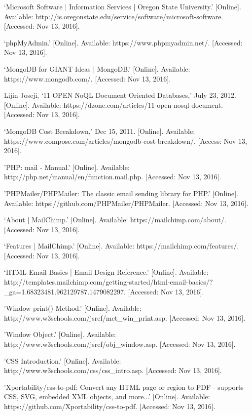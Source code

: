 \documentclass[letterpaper,10pt,serif, draftclsnofoot,onecolumn, compsoc, titlepage]{IEEEtran}
\begin{document}
\begin{thebibliography}{2}
`Microsoft Software | Information Services | Oregon State University.' [Online]. Available: http://is.oregonstate.edu/service/software/microsoft-software. [Accessed: Nov 13, 2016].

`phpMyAdmin.' [Online]. Available: https://www.phpmyadmin.net/. [Accessed: Nov 13, 2016].

`MongoDB for GIANT Ideas | MongoDB.' [Online]. Available: https://www.mongodb.com/. [Accessed: Nov 13, 2016].

Lijin Joseji, `11 OPEN NoQL Document Oriented Databases,' July 23, 2012. [Online]. Available: https://dzone.com/articles/11-open-nosql-document. [Accessed: Nov 13, 2016].

`MongoDB Cost Breakdown,' Dec 15, 2011. [Online]. Available: https://www.compose.com/articles/mongodb-cost-breakdown/. [Access: Nov 13, 2016].

'PHP: mail - Manual.' [Online]. Available: http://php.net/manual/en/function.mail.php. [Accessed: Nov 13, 2016].

'PHPMailer/PHPMailer: The classic email sending library for PHP.' [Online]. Available: https://github.com/PHPMailer/PHPMailer. [Accessed: Nov 13, 2016].

`About | MailChimp.' [Online]. Available: https://mailchimp.com/about/. [Accessed: Nov 13, 2016]. 

`Features | MailChimp.' [Online]. Available: https://mailchimp.com/features/. [Accessed: Nov 13, 2016].

`HTML Email Basics | Email Design Reference.' [Online]. Available: http://templates.mailchimp.com/getting-started/html-email-basics/?\_ga=1.68323481.962129787.1479082297. [Accessed: Nov 13, 2016].

'Window print() Method.' [Online]. Available: http://www.w3schools.com/jsref/met\_win\_print.asp. [Accessed: Nov 13, 2016].

'Window Object.'  [Online]. Available: http://www.w3schools.com/jsref/obj\_window.asp. [Accessed: Nov 13, 2016].

'CSS Introduction.' [Online]. Available: http://www.w3schools.com/css/css\_intro.asp. [Accessed: Nov 13, 2016].

'Xportability/css-to-pdf: Convert any HTML page or region to PDF - supports CSS, SVG, embedded XML objects, and more...' [Online]. Available: https://github.com/Xportability/css-to-pdf. [Accessed: Nov 13, 2016].


\end{thebibliography}
\end{document}
